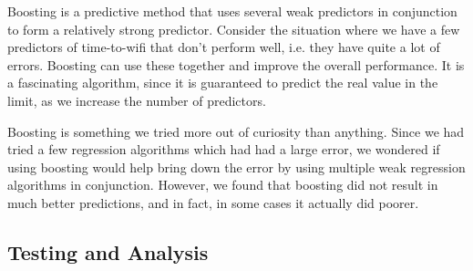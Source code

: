 \documentclass[12pt, fleqn]{article}
\begin{document}
Boosting is a predictive method that uses several weak predictors in conjunction 
to form a relatively strong predictor. Consider the situation where we have a 
few predictors of time-to-wifi that don't perform well, i.e. they have quite a 
lot of errors. Boosting can use these together and improve the overall 
performance. It is a fascinating algorithm, since it is guaranteed to predict the 
real value in the limit, as we increase the number of predictors. 

Boosting is something we tried more out of curiosity than anything. Since we 
had tried a few regression algorithms which had had a large error, we wondered if 
using boosting would help bring down the error by using multiple weak regression algorithms 
in conjunction. However, we found that boosting did not result in much 
better predictions, and in fact, in some cases it actually did poorer. 

\subsection{Testing and Analysis}
\label{time-to-wifi-analysis}
\end{document}
